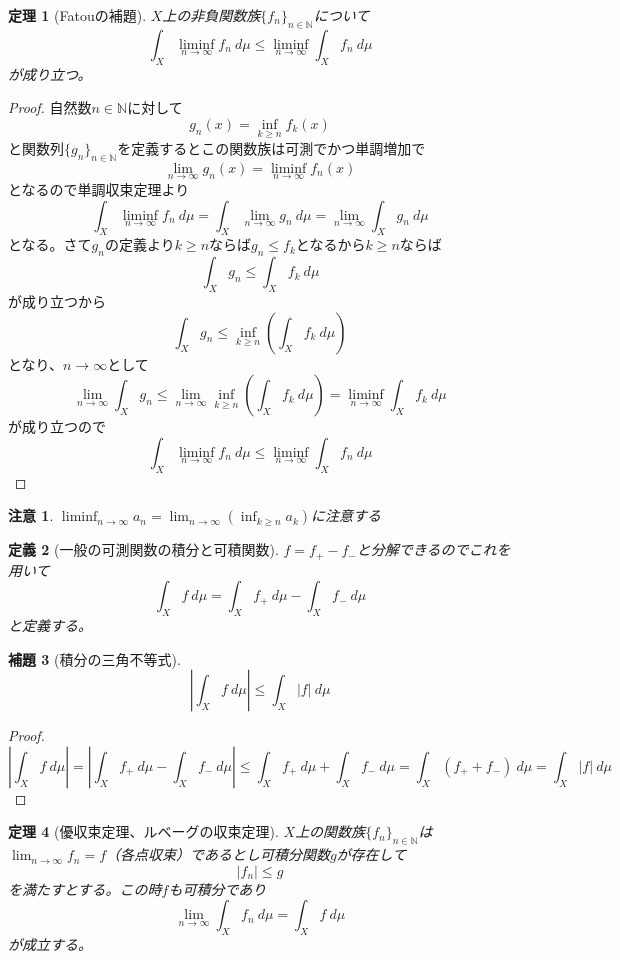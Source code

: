 \documentclass[leqno]{jsarticle}
\newtheorem{thm}{定理}
\newtheorem{lem}[thm]{補題}
\newtheorem{df}[thm]{定義}
\newtheorem*{cau}{注意}
\newcommand{\nn}{\mathbb{N}}
\newcommand{\mgn}{\infty}
\newcommand{\dpst}{\displaystyle}
\newcommand{\ffnn}{\{f_{n}\}_{n\in \nn}}
\begin{document}
\begin{thm}[Fatouの補題]\label{fatou}$X$上の非負関数族$\ffnn$について
\[
\int_X\liminf_{n\to \mgn}f_n\ d\mu\le \liminf_{n\to \mgn}\int_X f_n\ d\mu
\]が成り立つ。
\end{thm}

\begin{proof}自然数$n\in \nn$に対して
\[
g_{n}(x)=\inf_{k\ge n}f_{k}(x)
\]と関数列$\{g_n\}_{n\in \nn}$を定義するとこの関数族は可測でかつ単調増加で
\[
\lim_{n\to\mgn}g_{n}(x)=\liminf_{n\to \mgn}f_{n}(x)
\]
となるので単調収束定理より
\[
\int_X\liminf_{n\to \mgn} f_n\ d\mu =\int_X\lim_{n\to\mgn}g_n\ d\mu=\lim_{n\to\mgn}\int_Xg_n\ d\mu
\]となる。さて$g_n$の定義より$k\ge n$ならば$g_n\le f_k$となるから$k\ge n$ならば
\[
\int_Xg_n\le \int_Xf_k\ d\mu
\]が成り立つから
\[
\int_Xg_n\le \inf_{k\ge n}\left(\int_Xf_k\ d\mu\right)
\]となり、$n\to\mgn$として
\[
\lim_{n\to\mgn}\int_Xg_n\le \lim_{n\to\mgn}\inf_{k\ge n}\left(\int_Xf_k\ d\mu\right)
=\liminf_{n\to \mgn}\int_Xf_k\ d\mu
\]
が成り立つので
\[
\int_X\liminf_{n\to \mgn}f_n\ d\mu\le \liminf_{n\to \mgn}\int_X f_n\ d\mu
\]
\end{proof}
\begin{cau}
$\dpst \liminf_{n\to \mgn} a_n=\lim_{n\to\mgn}(\inf_{k\ge n}a_k)$に注意する
\end{cau}

\begin{df}[一般の可測関数の積分と可積関数]
$f=f_{+}-f_{-}$と分解できるのでこれを用いて
\[
\int_X f\ d\mu=\int_X f_{+}\ d\mu-\int_X f_{-}\ d\mu
\]と定義する。
\end{df}



\begin{lem}[積分の三角不等式]
\[
\left|\int_X f\ d\mu \right|\le \int_X |f|\ d\mu
\]
\end{lem}
\begin{proof}
\[
\left|\int_X f\ d\mu \right|=\left|\int_X f_{+}\ d\mu-\int_X f_{-}\ d\mu \right|\le
\int_X f_{+}\ d\mu+\int_X f_{-}\ d\mu=\int_X (f_{+}+f_{-})\ d\mu=\int_X |f|\ d\mu
\]
\end{proof}

\begin{thm}[優収束定理、ルベーグの収束定理]$X$上の関数族$\ffnn$は$\displaystyle \lim_{n\to \infty}f_n=f$（各点収束）であるとし可積分関数$g$が存在して
 \[
  |f_n|\le g
 \]
を満たすとする。この時$f$も可積分であり
 \[
  \lim_{n\to \infty}\int_X f_n\ d\mu=\int_X f\ d\mu
 \]が成立する。
\end{thm}
\end{document}
